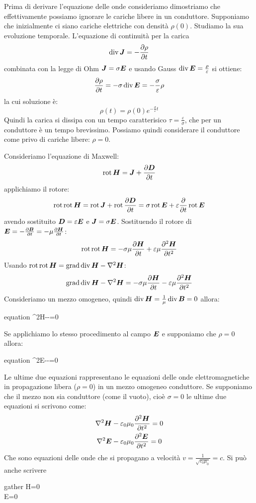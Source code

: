 Prima di derivare l'equazione delle onde consideriamo dimostriamo che effettivamente possiamo ignorare le cariche libere in un conduttore. Supponiamo che inizialmente ci siano cariche elettriche con densità $\rho(0)$. Studiamo la sua evoluzione temporale. L'equazione di continuità per la carica
\[
  \operatorname{div} \boldsymbol{J} = -\frac{\partial \rho}{\partial t}
\]
combinata con la legge di Ohm $\boldsymbol{J} = \sigma \boldsymbol{E}$ e usando Gauss $\operatorname{div} \boldsymbol{E} = \frac{\rho}{\varepsilon}$ si ottiene:
\[
  \frac{\partial \rho}{\partial t} = -\sigma \operatorname{div}\boldsymbol{E} = -\frac{\sigma}{\varepsilon}\rho
\]
la cui soluzione è:
\[
  \rho(t) = \rho(0)e^{-\frac{\sigma}{\varepsilon}t}
\]
Quindi la carica si dissipa con un tempo caratterisico $\tau = \frac{\varepsilon}{\sigma}$, che per un conduttore è un tempo brevissimo. Possiamo quindi considerare il conduttore come privo di cariche libere: $\rho=0$.

Consideriamo l'equazione di Maxwell:
\[
  \operatorname{rot}\boldsymbol{H}=\boldsymbol{J}+\frac{\partial\boldsymbol{D}}{\partial t}
\]
applichiamo il rotore:
\[
  \operatorname{rot}\operatorname{rot} \boldsymbol{H}=\operatorname{rot} \boldsymbol{J}+\operatorname{rot}\frac{\partial\boldsymbol{D}}{\partial t}=\sigma\operatorname{rot}\boldsymbol{E}+\varepsilon\frac{\partial}{\partial t}\operatorname{rot}\boldsymbol{E}
\]
avendo sostituito $\boldsymbol{D}=\varepsilon\boldsymbol{E}$ e $\boldsymbol{J}=\sigma \boldsymbol{E}$. Sostituendo il rotore di $\boldsymbol{E}=-\frac{\partial\boldsymbol{B}}{\partial t}=-\mu\frac{\partial\boldsymbol{H}}{\partial t}$:
\[
  \operatorname{rot}\operatorname{rot} \boldsymbol{H}=-\sigma\mu\frac{\partial\boldsymbol{H}}{\partial t}+\varepsilon\mu\frac{\partial^2\boldsymbol{H}}{\partial t^2}
\]
Usando $\operatorname{rot}\operatorname{rot}\boldsymbol{H}=\operatorname{grad}\operatorname{div}\boldsymbol{H}-\nabla^2\boldsymbol{H}$:
\begin{equation}
  \operatorname{grad}\operatorname{div}\boldsymbol{H}-\nabla^2\boldsymbol{H}=-\sigma\mu\frac{\partial\boldsymbol{H}}{\partial t}-\varepsilon\mu\frac{\partial^2\boldsymbol{H}}{\partial t^2}
\end{equation}
Consideriamo un mezzo omogeneo, quindi $\operatorname{div}\boldsymbol{H}=\frac{1}{\mu}\operatorname{div}\boldsymbol{B}=0$ allora:
\begin{eqimp}{equation}
  \nabla^2\ve H-\varepsilon\mu{}-\sigma\mu{}=0
\end{eqimp}
Se applichiamo lo stesso procedimento al campo $\boldsymbol{E}$ e supponiamo che $\rho=0$ allora:
\begin{eqimp}{equation}
  \nabla^2\ve E-\varepsilon\mu{}-\sigma\mu{}=0
\end{eqimp}
Le ultime due equazioni rappresentano le equazioni delle onde elettromagnetiche in propagazione libera ($\rho=0$) in un mezzo omogeneo conduttore. Se supponiamo che il mezzo non sia conduttore (come il vuoto), cioè $\sigma=0$ le ultime due equazioni si scrivono come:
\begin{gather}
  \nabla^2\boldsymbol{H}-\varepsilon_0\mu_0\frac{\partial^2\boldsymbol{H}}{\partial t^2}=0\\
  \nabla^2\boldsymbol{E}-\varepsilon_0\mu_0\frac{\partial^2\boldsymbol{E}}{\partial t^2}=0
\end{gather}
Che sono equazioni delle onde che si propagano a velocità $v=\frac{1}{\sqrt{\varepsilon_0\mu_0}}=c$.
Si può anche scrivere
\begin{eqimp}{gather}
  \Box\ve H=0\\
  \Box\ve E=0
\end{eqimp}



